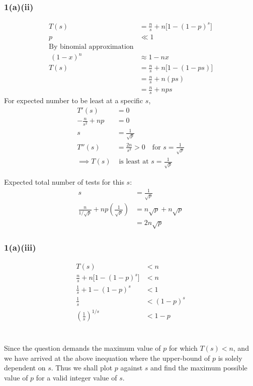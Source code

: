\documentclass[12pt]{article}
\begin{document}
\subsubsection{1(a)(ii)}
\begin{align*}
T(s) &= \frac{n}{s} + n\big[1-(1-p)^s\big] \\
p &\ll 1 \\
\text{By binomial approximation} \\
 \ (1-x)^n &\approx 1-nx \\
T(s) &= \frac{n}{s} + n\Big[1-(1-ps)\Big] \\
&= \frac{n}{s} + n(ps) \\
&= \frac{n}{s} + nps
\end{align*}
For expected number to be least at a specific $s$,
\begin{align*}
T'(s) &= 0 \\
-\frac{n}{s^2} + np &= 0 \\
s &= \frac{1}{\sqrt{p}} \\
T''(s) &= \frac{2n}{s^3} > 0 \quad \text{for } s=\frac{1}{\sqrt{p}} \\
\implies T(s) &\text{ is least at } s=\frac{1}{\sqrt{p}}
\end{align*}


\begin{center}
\end{center}

Expected total number of tests for this $s$:
\begin{align*}
s &= \frac{1}{\sqrt{p}} \\
\frac{n}{1/\sqrt{p}} + np\left(\frac{1}{\sqrt{p}}\right) 
&= n\sqrt{p} + n\sqrt{p} \\
&= 2n\sqrt{p}
\end{align*}

\begin{center}
\end{center}

\subsubsection{1(a)(iii)}
\begin{align*}
T(s) &< n \\
\frac{n}{s} + n\big[1-(1-p)^s\big] &< n \\
\frac{1}{s} + 1-(1-p)^s &< 1 \\
\frac{1}{s} &< (1-p)^s \\
\left(\frac{1}{s}\right)^{1/s} &< 1-p \\
\end{align*}
\begin{center}
\end{center}\\
Since the question demands the maximum value of $p$ for which $T(s)<n$, and we have arrived at the above inequation where the upper-bound of $p$ is solely dependent on $s$. Thus we shall plot $p$ against $s$ and find the maximum possible value of $p$ for a valid integer value of $s$. 
\end{document}
